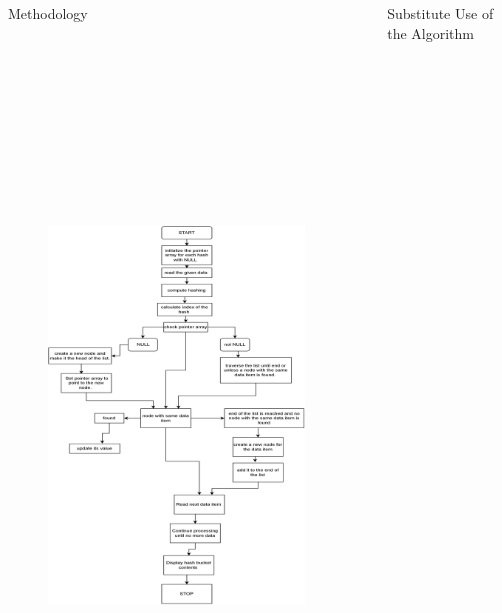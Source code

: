 \documentclass[final]{beamer}
\newlength{\sepwidth}
\newlength{\colwidth}
\newcommand{\separatorcolumn}{\begin{column}{\sepwidth}\end{column}}
\begin{document}
\begin{frame}[t]
\begin{columns}[t]
\begin{column}{\colwidth}
\begin{alertblock}{Methodology}
\begin{multicols}{2}
\begin{figure}
    \includegraphics[width=12cm,height=20cm]{image3.jpeg}
\end{figure}
        \end{multicols}
	\end{alertblock}
        
			
		\end{column}
	
		\separatorcolumn
		
		\begin{column}{\colwidth}
			
			\begin{alertblock}{Substitute Use of the Algorithm}{}
            

\end{alertblock}
\end{column}
\end{columns}
\end{frame}
\end{document}
